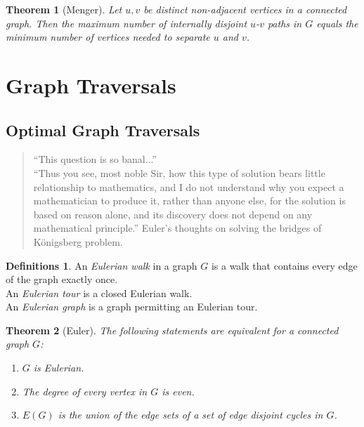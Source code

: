 \documentclass{article}
\newtheorem*{thm}{Theorem}
\theoremstyle{definition}
\newtheorem*{defns}{Definitions}
\begin{document}

\begin{thm}[Menger]
Let $u,v$ be distinct non-adjacent vertices in a connected graph.
Then the maximum number of internally disjoint $u$-$v$ paths in $G$ equals the minimum number of vertices needed to separate $u$ and $v$.
\end{thm}

\section{Graph Traversals}
\subsection{Optimal Graph Traversals}

\begin{quotation}
``This question is so banal...'' \\
``Thus you see, most noble Sir, how this type of solution bears little relationship to mathematics, and I do not understand why you expect a     mathematician to produce it, rather than anyone else, for the solution is based on reason alone, and its discovery does not depend on any mathematical principle.'' Euler's thoughts on solving the bridges of K\"onigsberg problem.
\end{quotation}

\begin{defns}
An \emph{Eulerian walk} in a graph $G$ is a walk that contains every edge of the graph exactly once. \\
An \emph{Eulerian tour} is a closed Eulerian walk. \\
An \emph{Eulerian graph} is a graph permitting an Eulerian tour.
\end{defns}

\begin{thm}[Euler]
The following statements are equivalent for a connected graph $G$:
\begin{enumerate}
\item $G$ is Eulerian.
\item The degree of every vertex in $G$ is even.
\item $E(G)$ is the union of the edge sets of a set of edge disjoint cycles in $G$.
\end{enumerate}
\end{thm}
\end{document}

